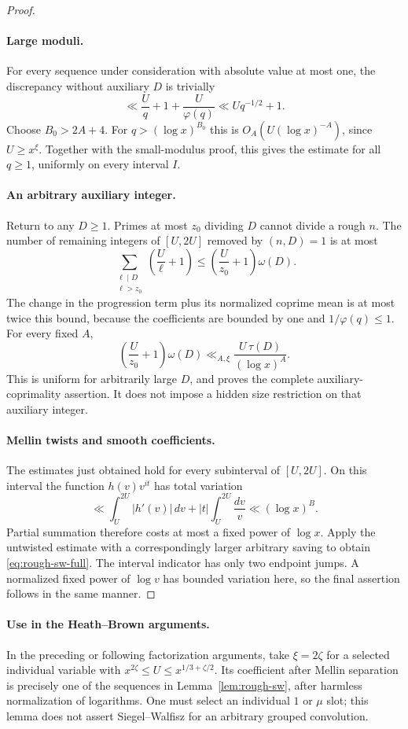 \begin{proof}
\paragraph{Large moduli.}
For every sequence under consideration with absolute value
at most one, the discrepancy without auxiliary $D$ is trivially
\[
 \ll \frac Uq+1+\frac U{\varphi(q)}
       \ll Uq^{-1/2}+1.
\]
Choose $B_0>2A+4$. For $q>(\log x)^{B_0}$ this is
$O_A(U(\log x)^{-A})$, since $U\ge x^\xi$.
Together with the small-modulus proof, this gives the estimate
for all $q\ge1$, uniformly on every interval $I$.

\paragraph{An arbitrary auxiliary integer.}
Return to any $D\ge1$.
Primes at most $z_0$ dividing $D$ cannot divide a rough $n$.
The number of remaining integers of $[U,2U]$ removed by
$(n,D)=1$ is at most
\[
 \sum_{\substack{\ell\mid D\\\ell>z_0}}
           \left(\frac U\ell+1\right)
       \le\left(\frac U{z_0}+1\right)\omega(D).
\]
The change in the progression term plus its normalized
coprime mean is at most twice this bound, because the
coefficients are bounded by one and $1/\varphi(q)\le1$.
For every fixed $A$,
\[
 \left(\frac U{z_0}+1\right)\omega(D)
        \ll_{A,\xi}\frac{U\,\tau(D)}{(\log x)^A}.
\]
This is uniform for arbitrarily large $D$, and proves the
complete auxiliary-coprimality assertion. It does not
impose a hidden size restriction on that auxiliary integer.

\paragraph{Mellin twists and smooth coefficients.}
The estimates just obtained hold for every subinterval
of $[U,2U]$.
On this interval the function $h(v)v^{it}$ has total variation
\[
 \ll \int_U^{2U}|h'(v)|\,dv
                 +|t|\int_U^{2U}\frac{dv}{v}
 \ll(\log x)^B.
\]
Partial summation therefore costs at most a fixed power of
$\log x$. Apply the untwisted estimate with a correspondingly
larger arbitrary saving to obtain \eqref{eq:rough-sw-full}.
The interval indicator has only two endpoint jumps.
A normalized fixed power of $\log v$ has bounded variation
here, so the final assertion follows in the same manner.
\end{proof}

\paragraph{Use in the Heath--Brown arguments.}
In the preceding or following factorization arguments, take
$\xi=2\zeta$ for a selected individual variable with
$x^{2\zeta}\le U\le x^{1/3+\zeta/2}$.
Its coefficient after Mellin separation is precisely one of
the sequences in Lemma~\ref{lem:rough-sw}, after harmless
normalization of logarithms.
One must select an individual $1$ or $\mu$ slot; this lemma
does not assert Siegel--Walfisz for an arbitrary grouped
convolution.

